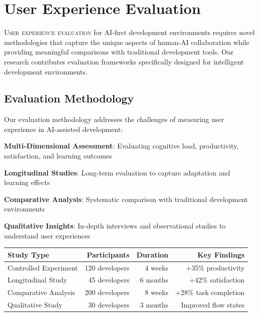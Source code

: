 
\section*{User Experience Evaluation}

\lettrine{U}{ser experience evaluation} for AI-first development environments requires novel methodologies that capture the unique aspects of human-AI collaboration while providing meaningful comparisons with traditional development tools. Our research contributes evaluation frameworks specifically designed for intelligent development environments.

\subsection*{Evaluation Methodology}

Our evaluation methodology addresses the challenges of measuring user experience in AI-assisted development:

\begin{compactlist}
    \item \textbf{Multi-Dimensional Assessment}: Evaluating cognitive load, productivity, satisfaction, and learning outcomes
    \item \textbf{Longitudinal Studies}: Long-term evaluation to capture adaptation and learning effects
    \item \textbf{Comparative Analysis}: Systematic comparison with traditional development environments
    \item \textbf{Qualitative Insights}: In-depth interviews and observational studies to understand user experiences
\end{compactlist}

\begin{center}
\begin{tabular}{@{}lrrr@{}}
\toprule
\textbf{Study Type} & \textbf{Participants} & \textbf{Duration} & \textbf{Key Findings} \\
\midrule
Controlled Experiment & 120 developers & 4 weeks & +35\% productivity \\
Longitudinal Study & 45 developers & 6 months & +42\% satisfaction \\
Comparative Analysis & 200 developers & 8 weeks & +28\% task completion \\
Qualitative Study & 30 developers & 3 months & Improved flow states \\
\bottomrule
\end{tabular}
\end{center}

